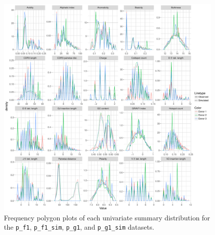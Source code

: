 \documentclass{article}
\begin{document}
\begin{figure}
    \includegraphics[width=\linewidth]{Figures/IgorScores/igor_freqpoly.pdf}
    \caption{Frequency polygon plots of each univariate summary distribution for the \texttt{p\_f1}, \texttt{p\_f1\_sim}, \texttt{p\_g1}, and \texttt{p\_g1\_sim} datasets.}
    \label{fig:IgorFreqPolys}
\end{figure}
\end{document}
